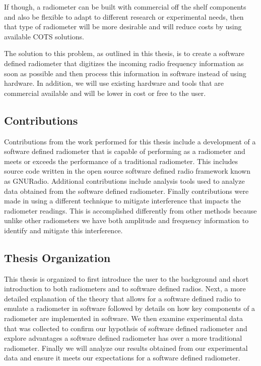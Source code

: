 If though, a radiometer can be built with commercial off the shelf components and also be flexible to adapt to different research or experimental needs, then that type of radiometer will be more desirable and will reduce costs by using available COTS solutions.  

The solution to this problem, as outlined in this thesis, is to create a software defined radiometer that digitizes the incoming radio frequency information as soon as possible and then process this information in software instead of using hardware.  In addition, we will use existing hardware and tools that are commercial available and will be lower in cost or free to the user.  

\subsection{Contributions}
Contributions from the work performed for this thesis include a development of a software defined radiometer that is capable of performing as a radiometer and meets or exceeds the performance of a traditional radiometer.  This includes source code written in the open source software defined radio framework known as GNURadio.  Additional contributions include analysis tools used to analyze data obtained from the software defined radiometer.  Finally contributions were made in using a different technique to mitigate interference that impacts the radiometer readings.  This is accomplished differently from other methods because unlike other radiometers we have both amplitude and frequency information to identify and mitigate this interference.

\subsection{Thesis Organization}
This thesis is organized to first introduce the user to the background and short introduction to both radiometers and to software defined radios.  Next, a more detailed explanation of the theory that allows for a software defined radio to emulate a radiometer in software followed by details on how key components of a radiometer are implemented in software.  We then examine experimental data that was collected to confirm our hypothsis of software defined radiometer and explore advantages a software defined radiometer has over a more traditional radiometer.  Finally we will analyze our results obtained from our experimental data and ensure it meets our expectations for a software defined radiometer.

